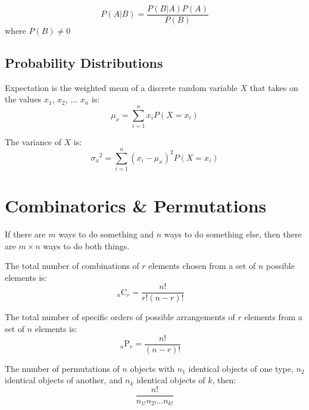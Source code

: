 \documentclass[11pt]{article}
\newcommand{\comb}[2]{{}_{#1}\mathrm{C}_{#2}}
\newcommand{\perm}[2]{{}_{#1}\mathrm{P}_{#2}}
\begin{document}
\begin{definition}\label{def:bayes-thm}
    \begin{equation*}
        P(A | B) = \frac{P(B | A) P(A)}{P(B)}
    \end{equation*}
    where $P(B) \neq 0$
\end{definition}

\subsection{Probability Distributions}

\begin{definition}[Expectation]\label{def:expectation}
    Expectation is the weighted mean of a discrete random variable $X$
    that takes on the values $x_1$, $x_2$, ... $x_n$ is:
    \begin{equation*}
        \mu_x = \sum_{i = 1}^n x_i P(X = x_i)
    \end{equation*}

    The variance of $X$ is:
    \begin{equation*}
        {\sigma_x}^2 = \sum_{i = 1}^n (x_i - \mu_x)^2 P(X = x_i)
    \end{equation*}
\end{definition}

\section{Combinatorics \& Permutations}

\begin{definition}\label{def:fund-count-principle}
    If there are $m$ ways to do something and $n$ ways to do something else, then there are
    $m \times n$ ways to do both things.
\end{definition}

\begin{definition}\label{def:combinations-formula}
    The total number of combinations of $r$ elements chosen from a set of $n$ possible elements is:
    \begin{equation*}
        \comb{n}{r} = \frac{n!}{r!(n-r)!}\quad
    \end{equation*}
\end{definition}

\begin{definition}\label{def:permutations-formula}
    The total number of specific orders of possible arrangements of $r$
    elements from a set of $n$ elements is:
    \begin{equation*}
        \perm{n}{r} = \frac{n!}{(n-r)!}\quad
    \end{equation*}

    The number of permutations of $n$ objects with $n_1$ identical objects
    of one type, $n_2$ identical objects of another, and $n_k$ identical objects
    of $k$, then:
    \begin{equation*}
        \frac{n!}{n_{1!}n_{2!} ... n_{k!}}
    \end{equation*}
\end{definition}
\end{document}
